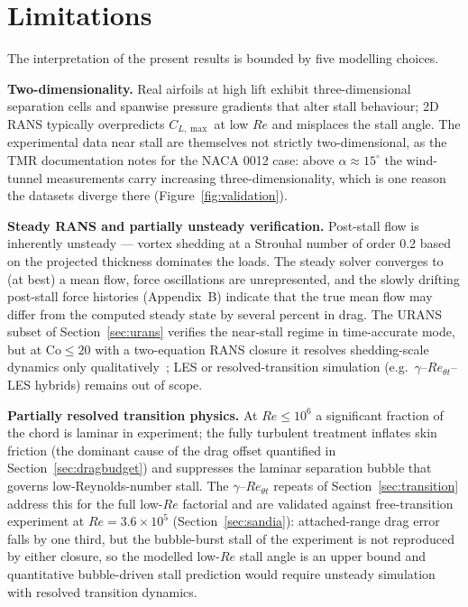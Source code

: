 \documentclass[11pt,a4paper]{article}
\begin{document}
\section{Limitations}\label{sec:limitations}
The interpretation of the present results is bounded by five modelling choices.

\textbf{Two-dimensionality.} Real airfoils at high lift exhibit three-dimensional separation cells and spanwise pressure gradients that alter stall behaviour; 2D RANS typically overpredicts $C_{L,\max}$ at low $Re$ and misplaces the stall angle. The experimental data near stall are themselves not strictly two-dimensional, as the TMR documentation notes for the NACA 0012 case: above $\alpha \approx 15^\circ$ the wind-tunnel measurements carry increasing three-dimensionality, which is one reason the datasets diverge there (Figure~\ref{fig:validation}).

\textbf{Steady RANS and partially unsteady verification.} Post-stall flow is inherently unsteady --- vortex shedding at a Strouhal number of order 0.2 based on the projected thickness dominates the loads. The steady solver converges to (at best) a mean flow, force oscillations are unrepresented, and the slowly drifting post-stall force histories (Appendix~B) indicate that the true mean flow may differ from the computed steady state by several percent in drag. The URANS subset of Section~\ref{sec:urans} verifies the near-stall regime in time-accurate mode, but at $\mathrm{Co} \le 20$ with a two-equation RANS closure it resolves shedding-scale dynamics only qualitatively~\cite{spalart2000}; LES or resolved-transition simulation (e.g.\ $\gamma$--$Re_{\theta t}$--LES hybrids) remains out of scope.

\textbf{Partially resolved transition physics.} At $Re \le 10^6$ a significant fraction of the chord is laminar in experiment; the fully turbulent treatment inflates skin friction (the dominant cause of the drag offset quantified in Section~\ref{sec:dragbudget}) and suppresses the laminar separation bubble that governs low-Reynolds-number stall. The $\gamma$--$Re_{\theta t}$ repeats of Section~\ref{sec:transition} address this for the full low-$Re$ factorial and are validated against free-transition experiment at $Re = 3.6\times10^5$ (Section~\ref{sec:sandia}): attached-range drag error falls by one third, but the bubble-burst stall of the experiment is not reproduced by either closure, so the modelled low-$Re$ stall angle is an upper bound and quantitative bubble-driven stall prediction would require unsteady simulation with resolved transition dynamics.
\end{document}

